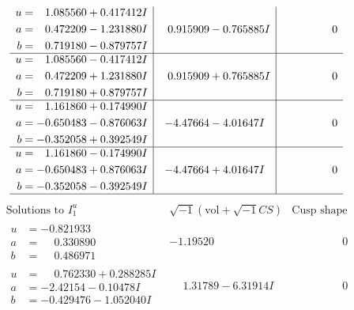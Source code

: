 \documentclass[1p]{elsarticle_modified}
\theoremstyle{definition}
\newcommand{\I}{\sqrt{-1}}
\begin{document}
$$\begin{array}{c|c|c}
\begin{aligned}
u &= \phantom{-}1.085560 + 0.417412 I \\
a &= \phantom{-}0.472209 - 1.231880 I \\
b &= \phantom{-}0.719180 - 0.879757 I\end{aligned}
 & \phantom{-}0.915909 - 0.765885 I & \phantom{-0.000000 } 0 \\ \hline\begin{aligned}
u &= \phantom{-}1.085560 - 0.417412 I \\
a &= \phantom{-}0.472209 + 1.231880 I \\
b &= \phantom{-}0.719180 + 0.879757 I\end{aligned}
 & \phantom{-}0.915909 + 0.765885 I & \phantom{-0.000000 } 0 \\ \hline\begin{aligned}
u &= \phantom{-}1.161860 + 0.174990 I \\
a &= -0.650483 - 0.876063 I \\
b &= -0.352058 + 0.392549 I\end{aligned}
 & -4.47664 - 4.01647 I & \phantom{-0.000000 } 0 \\ \hline\begin{aligned}
u &= \phantom{-}1.161860 - 0.174990 I \\
a &= -0.650483 + 0.876063 I \\
b &= -0.352058 - 0.392549 I\end{aligned}
 & -4.47664 + 4.01647 I & \phantom{-0.000000 } 0\\
 \hline 
 \end{array}$$\newpage$$\begin{array}{c|c|c}  
\text{Solutions to }I^u_{1}& \I (\text{vol} + \sqrt{-1}CS) & \text{Cusp shape}\\
 \hline 
\begin{aligned}
u &= -0.821933\phantom{ +0.000000I} \\
a &= \phantom{-}0.330890\phantom{ +0.000000I} \\
b &= \phantom{-}0.486971\phantom{ +0.000000I}\end{aligned}
 & -1.19520\phantom{ +0.000000I} & \phantom{-0.000000 } 0 \\ \hline\begin{aligned}
u &= \phantom{-}0.762330 + 0.288285 I \\
a &= -2.42154 - 0.10478 I \\
b &= -0.429476 - 1.052040 I\end{aligned}
 & \phantom{-}1.31789 - 6.31914 I & \phantom{-0.000000 } 0 \\ \hline\begin{aligned}

\end{aligned}
\end{array}$$
\end{document}
